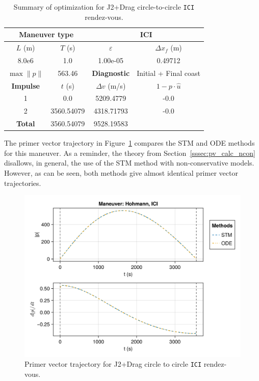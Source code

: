 \begin{table}[htpb]
    \centering
    \begin{tabular}{cccc} \toprule
    \multicolumn{2}{c}{\textbf{Maneuver type}} & \multicolumn{2}{c}{ICI} \\ \midrule
    \(L\) (m) & \(T\) (s) & \(\varepsilon\) & \(\Delta x_{f}\) (m)    \\ \midrule
    8.0e6          & 1.0          & 1.00e-05                & 0.49712                        \\ \midrule
    \(\max \lVert p \rVert\) & 563.46     & \textbf{Diagnostic}   & Initial + Final coast        \\ \midrule
    \textbf{Impulse} & \(t\) (s) & \(\Delta v\) (m/s) & \(1 - p \cdot \hat{u}\) \\ \midrule
    1                 & 0.0          & 5209.4779             & -0.0                    \\
    2                 & 3560.54079          & 4318.71793             & -0.0                    \\\midrule
    \textbf{Total}   & 3560.54079          & 9528.19583             &                     \\ \bottomrule   
    \end{tabular}
    \caption{Summary of optimization for J2+Drag circle-to-circle \texttt{ICI} rendez-vous.}
    \label{tab:jd_c2c_ICI_tab}
\end{table}

The primer vector trajectory in Figure~\ref{fig:jd_c2c_ICI_pv} compares the STM and ODE methods for this maneuver. As a reminder, the theory from Section~\ref{sssec:pv_calc_ncon} disallows, in general, the use of the STM method with non-conservative models. However, as can be seen, both methods give almost identical primer vector trajectories.

\begin{figure}[htbp]
    \centering
    \includegraphics[width=\textwidth]{../results/j2drag/hohmann/ICI_primer_vector.png}
    \caption{Primer vector trajectory for J2+Drag circle to circle \texttt{ICI} rendez-vous.}
    \label{fig:jd_c2c_ICI_pv}
\end{figure}

